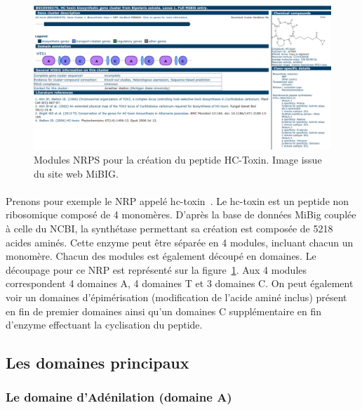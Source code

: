 \documentclass[12pt,french,twoside]{report}
\begin{document}
\begin{figure}[h!]
  \begin{center}
    \includegraphics[width=480px]{Figures/bio/Intro/hc-toxin.png}
    \caption{\label{mibig_hc}Modules NRPS pour la création du peptide HC-Toxin.
    Image issue du site web MiBIG.}
  \end{center}
\end{figure}

\paragraph{}Prenons pour exemple le NRP appelé hc-toxin~\cite{_mibig:_????}.
Le hc-toxin est un peptide non ribosomique composé de 4 monomères.
D'après la base de données MiBig couplée à celle du NCBI, la synthétase permettant sa création est composée de 5218 acides aminés.
Cette enzyme peut être séparée en 4 modules, incluant chacun un monomère.
Chacun des modules est également découpé en domaines.
Le découpage pour ce NRP est représenté sur la figure~\ref{mibig_hc}.
Aux 4 modules correspondent 4 domaines A, 4 domaines T et 3 domaines C.
On peut également voir un domaines d'épimérisation (modification de l'acide aminé inclus) présent en fin de premier domaines ainsi qu'un domaines C supplémentaire en fin d'enzyme effectuant la cyclisation du peptide.

\subsection{Les domaines principaux}

\subsubsection{Le domaine d'Adénilation (domaine A)}
\end{document}
